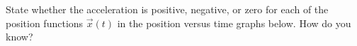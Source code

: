 \label{fnt8.2.1-1}

State whether the acceleration is positive, negative, or zero for each of the position functions $\vec{x}(t)$ in the position versus time graphs below. How do you know?